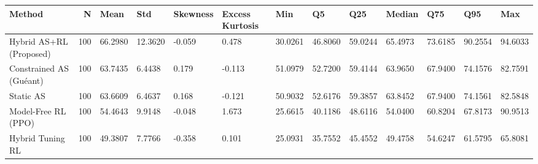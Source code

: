 \begin{tabular}{lrlllllllllll}
\toprule
Method & N & Mean & Std & Skewness & Excess Kurtosis & Min & Q5 & Q25 & Median & Q75 & Q95 & Max \\
\midrule
Hybrid AS+RL (Proposed) & 100 & 66.2980 & 12.3620 & -0.059 & 0.478 & 30.0261 & 46.8060 & 59.0244 & 65.4973 & 73.6185 & 90.2554 & 94.6033 \\
Constrained AS (Guéant) & 100 & 63.7435 & 6.4438 & 0.179 & -0.113 & 51.0979 & 52.7200 & 59.4144 & 63.9650 & 67.9400 & 74.1576 & 82.7591 \\
Static AS & 100 & 63.6609 & 6.4637 & 0.168 & -0.121 & 50.9032 & 52.6176 & 59.3857 & 63.8452 & 67.9400 & 74.1561 & 82.5848 \\
Model-Free RL (PPO) & 100 & 54.4643 & 9.9148 & -0.048 & 1.673 & 25.6615 & 40.1186 & 48.6116 & 54.0400 & 60.8204 & 67.8173 & 90.9513 \\
Hybrid Tuning RL & 100 & 49.3807 & 7.7766 & -0.358 & 0.101 & 25.0931 & 35.7552 & 45.4552 & 49.4758 & 54.6247 & 61.5795 & 65.8081 \\
\bottomrule
\end{tabular}
